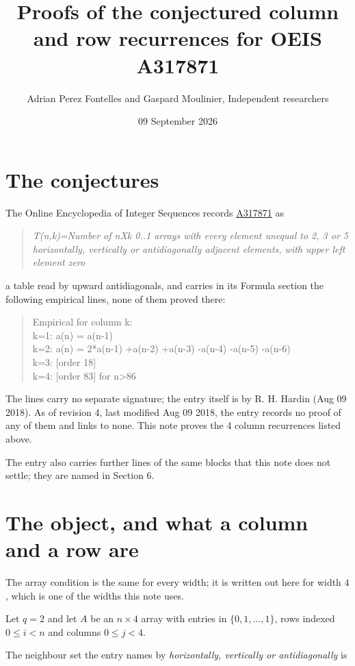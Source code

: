 \documentclass[11pt]{article}
\title{Proofs of the conjectured column and row recurrences for OEIS A317871}
\author{Adrian Perez Fontelles and Gaspard Moulinier, Independent researchers}
\date{09 September 2026}
\theoremstyle{definition}
\begin{document}
\maketitle
\section{The conjectures}

The Online Encyclopedia of Integer Sequences records \href{https://oeis.org/A317871}{A317871} as

\begin{quote}\itshape T(n,k)=Number of nXk 0..1 arrays with every element unequal to 2, 3 or 5 horizontally, vertically or antidiagonally adjacent elements, with upper left element zero\end{quote}

a table read by upward antidiagonals, and carries in its Formula section the following empirical lines, none of them proved there:

\begin{quote}\ttfamily Empirical for column k:\\
k=1: a(n) = a(n-1)\\k=2: a(n) = 2*a(n-1) +a(n-2) +a(n-3) -a(n-4) -a(n-5) -a(n-6)\\k=3: [order 18]\\k=4: [order 83] for n>86\end{quote}

The lines carry no separate signature; the entry itself is by R. H. Hardin (Aug 09 2018). As of revision 4, last modified Aug 09 2018, the entry records no proof of any of them and links to none. This note proves the 4 column recurrences listed above.

The entry also carries further lines of the same blocks that this note does not settle; they are named in Section 6.

\section{The object, and what a column and a row are}

The array condition is the same for every width; it is written out here for width $4$, which is one of the widths this note uses.

Let $q = 2$ and let $A$ be an $n \times 4$ array with entries in $\{0,1,\dots,1\}$, rows indexed $0 \le i < n$ and columns $0 \le j < 4$.

The neighbour set the entry names by {\itshape horizontally, vertically or antidiagonally} is
\end{document}
